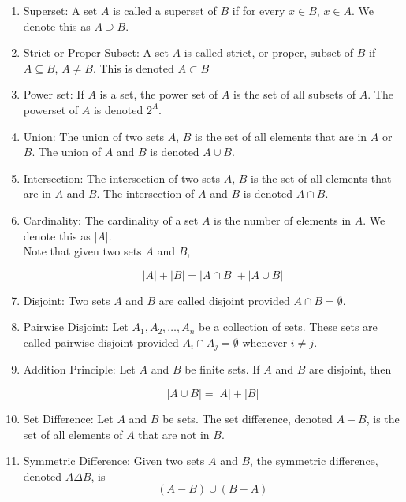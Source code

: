 \documentclass{article}
\begin{document}
\begin{enumerate}
    \item Superset: A set $A$ is called a superset of $B$ if for every $x\in B$, $x\in A$.
    We denote this as $A\supseteq B$.

    \item Strict or Proper Subset: A set $A$ is called strict, or proper, subset of $B$ if $A \subseteq B$, $A\neq B$.
    This is denoted $A\subset B$

    \item Power set: If $A$ is a set, the power set of $A$ is the set of all subsets of $A$.
    The powerset of $A$ is denoted $2^A$.

    \item Union: The union of two sets $A$, $B$ is the set of all elements that are in $A$ or $B$.
    The union of $A$ and $B$ is denoted $A\cup B$.

    \item Intersection: The intersection of two sets $A$, $B$ is the set of all elements that are in $A$ and $B$.
    The intersection of $A$ and $B$ is denoted $A\cap B$.

    \item Cardinality: The cardinality of a set $A$ is the number of elements in $A$.
    We denote this as $|A|$.\\

    Note that given two sets $A$ and $B$,

    \[|A|+|B|=|A\cap B|+|A\cup B|\]

    \item Disjoint: Two sets $A$ and $B$ are called disjoint provided $A\cap B=\emptyset$.

    \item Pairwise Disjoint: Let $A_1,A_2,\dots,A_n$ be a collection of sets.
    These sets are called pairwise disjoint provided $A_i\cap A_j=\emptyset$ whenever $i\neq j$.

    \item Addition Principle: Let $A$ and $B$ be finite sets.
    If $A$ and $B$ are disjoint, then

    \[|A\cup B|=|A|+|B|\]

    \item Set Difference: Let $A$ and $B$ be sets.
    The set difference, denoted $A-B$, is the set of all elements of $A$ that are not in $B$.

    \item Symmetric Difference: Given two sets $A$ and $B$, the symmetric difference, denoted $A\Delta B$, is 
    \[(A-B)\cup (B-A)\]
    

\end{enumerate}
\end{document}
